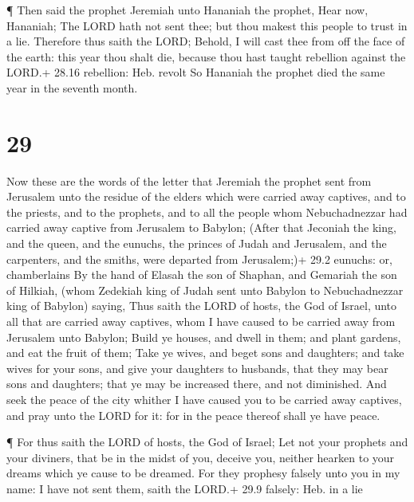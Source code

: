  ¶ Then said the prophet Jeremiah unto Hananiah the
prophet, Hear now, Hananiah; The LORD hath not sent thee; but thou
makest this people to trust in a lie.  Therefore thus saith
the LORD; Behold, I will cast thee from off the face of the earth: this
year thou shalt die, because thou hast taught rebellion against the
LORD.+ 28.16 rebellion: Heb. revolt  So Hananiah the
prophet died the same year in the seventh month.

\hypertarget{section-28}{%
\section{29}\label{section-28}}

 Now these are the words of the letter that Jeremiah the
prophet sent from Jerusalem unto the residue of the elders which were
carried away captives, and to the priests, and to the prophets, and to
all the people whom Nebuchadnezzar had carried away captive from
Jerusalem to Babylon;  (After that Jeconiah the king, and
the queen, and the eunuchs, the princes of Judah and Jerusalem, and the
carpenters, and the smiths, were departed from Jerusalem;)+ 29.2
eunuchs: or, chamberlains  By the hand of Elasah the son of
Shaphan, and Gemariah the son of Hilkiah, (whom Zedekiah king of Judah
sent unto Babylon to Nebuchadnezzar king of Babylon) saying,
 Thus saith the LORD of hosts, the God of Israel, unto all
that are carried away captives, whom I have caused to be carried away
from Jerusalem unto Babylon;  Build ye houses, and dwell in
them; and plant gardens, and eat the fruit of them;  Take ye
wives, and beget sons and daughters; and take wives for your sons, and
give your daughters to husbands, that they may bear sons and daughters;
that ye may be increased there, and not diminished.  And
seek the peace of the city whither I have caused you to be carried away
captives, and pray unto the LORD for it: for in the peace thereof shall
ye have peace.

 ¶ For thus saith the LORD of hosts, the God of Israel; Let
not your prophets and your diviners, that be in the midst of you,
deceive you, neither hearken to your dreams which ye cause to be
dreamed.  For they prophesy falsely unto you in my name: I
have not sent them, saith the LORD.+ 29.9 falsely: Heb. in a lie


